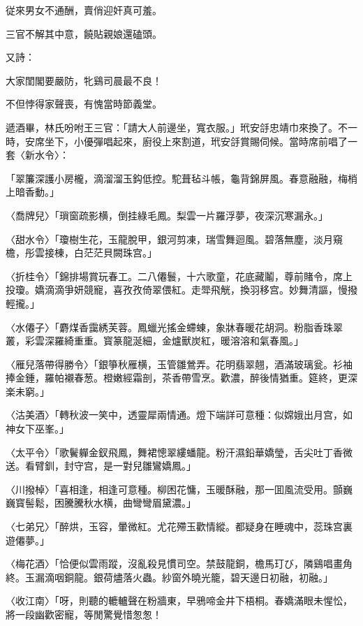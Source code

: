 \begin{myquote}
従來男女不通酬，賣俏迎奸真可羞。

三官不解其中意，饒貼親娘還磕頭。
\end{myquote}

又詩：

\begin{myquote}
大家閨閣要嚴防，牝鷄司晨最不良！

不但悖得家聲喪，有愧當時節義堂。
\end{myquote}

遞酒畢，林氏吩咐王三官：「請大人前邊坐，寬衣服。」玳安㧱忠靖巾來換了。不一時，安席坐下，小優彈唱起來，廚役上來割道，玳安㧱賞賜伺候。當時席前唱了一套〈新水令〉：

\begin{myquote}
「翠簾深護小房櫳，滴溜溜玉鈎低控。駝葺毡斗帳，龜背錦屏風。春意融融，梅梢上暗香動。」

{\markfont〈喬牌兒〉}「瑣窗疏影横，倒挂綠毛鳳。梨雲一片羅浮夢，夜深沉寒漏永。」

{\markfont〈甜水令〉}「瓊樹生花，玉龍脫甲，銀河剪凍，瑞雪舞迴風。碧落無塵，淡月窺檐，彤雲接棟，白茫茫貝闕珠宫。」

{\markfont〈折桂令〉}「錦排場賞玩春工。二八僊鬟，十六歌童，花底藏鬮，尊前賭令，席上投瓊。嬌滴滴爭妍競寵，喜孜孜倚翠偎紅。走斝飛觥，換羽移宫。妙舞清謳，慢撥輕攏。」

{\markfont〈水僊子〉}「麝煤香靄綉芙蓉。鳳蠟光搖金螮蝀，象牀春暖花胡洞。粉脂香珠翠叢，彩雲深羅綺重重。寳篆龍涎細，金爐獸炭紅，暖溶溶和氣春風。」

{\markfont〈雁兒落帶得勝令〉}「銀箏秋雁横，玉管雛鶯弄。花明翡翠翹，酒滿玻璃瓮。衫袖捧金鍾，羅帕襯春葱。橙嫩經霜剖，茶香帶雪烹。歡濃，醉後情猶重。筵終，更深楽未窮。」

{\markfont〈沽美酒〉}「轉秋波一笑中，透靈犀兩情通。燈下端詳可意種：似嫦娥出月宫，如神女下巫峯。」

{\markfont〈太平令〉}「歌鬢軃金釵飛鳳，舞裙憁翠縷蟠龍。粉汗濕鉛華嬌瑩，舌尖吐丁香微送。看臂釧，封守宫，是一對兒雛鸞嬌鳳。」

{\markfont〈川撥棹〉}「喜相逢，相逢可意種。柳困花慵，玉暖酥融，那一囬風流受用。顫巍巍寳髻鬆，困騰騰秋水横，曲彎彎眉黛濃。」

{\markfont〈七弟兄〉}「醉烘，玉容，暈微紅。尤花殢玉歡情縱。都疑身在睡魂中，蕊珠宫裏遊僊夢。」

{\markfont〈梅花酒〉}「恰便似雲雨蹤，沒亂殺見慣司空。禁鼓龍銅，檐馬玎び，隣鷄唱畫角終。玉漏滴咽銅龍。銀荷燼落火蟲。紗窗外曉光籠，碧天邊日初融，初融。」

{\markfont〈收江南〉}「呀，則聽的轆轤聲在粉牆東，早鴉啼金井下梧桐。春嬌滿眼未惺忪，將一段幽歡密寵，等閒驚覺惜怱怱！
\end{myquote}

